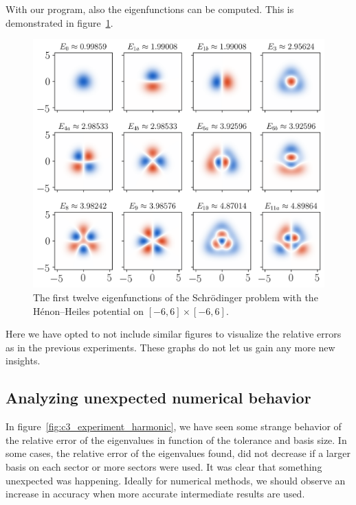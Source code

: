 With our program, also the eigenfunctions can be computed. This is demonstrated in figure~\ref{fig:henon_heiles_eigenfunction}.
\begin{figure}
  \begin{center}
    \includegraphics[width=\linewidth]{img/chapter3/experiments/henon_heiles_eigenfunctions.png}
    \caption{\label{fig:henon_heiles_eigenfunction} The first twelve eigenfunctions of the Schrödinger problem with the Hénon--Heiles potential on $[-6, 6]\times[-6,6]$.}
  \end{center}
\end{figure}

Here we have opted to not include similar figures to visualize the relative errors as in the previous experiments. These graphs do not let us gain any more new insights.

\subsection{Analyzing unexpected numerical behavior}\label{sec:c3_conclusion_hypothesis}

In figure~\ref{fig:c3_experiment_harmonic}, we have seen some strange behavior of the relative error of the eigenvalues in function of the tolerance and basis size. In some cases, the relative error of the eigenvalues found, did not decrease if a larger basis on each sector or more sectors were used. It was clear that something unexpected was happening. Ideally for numerical methods, we should observe an increase in accuracy when more accurate intermediate results are used.

